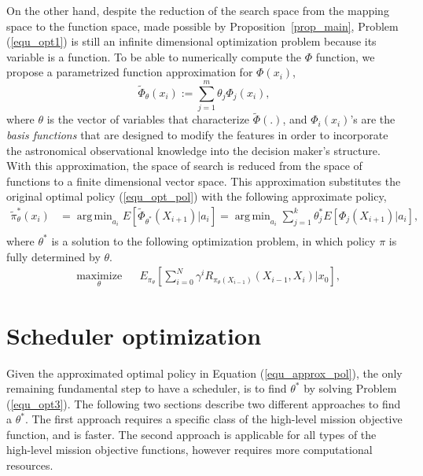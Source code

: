 \documentclass[12pt]{aastex62}
\theoremstyle{definition}
\DeclareMathOperator*{\argmin}{arg\,min}
\begin{document}
On the other hand, despite the reduction of the search space from the mapping space to the function space, made possible by Proposition~\ref{prop_main}, Problem (\ref{equ_opt1}) is still an infinite dimensional optimization problem because its variable is a function. To be able to numerically compute the $\Phi$ function, we propose a parametrized function approximation for $\Phi(x_{i})$,
\begin{equation*}
 \tilde{\Phi}_{\theta}({x}_{i}) := \sum_{j=1}^m \theta_j \Phi_j(x_{i}),
\end{equation*}
where $\theta$ is the vector of variables that characterize $\tilde{\Phi}(.)$, and $\Phi_i(x_i)$'s are the \textit{basis functions} that are designed to modify the features in order to incorporate the astronomical observational knowledge into the decision maker's structure. With this approximation, the space of search is reduced from the space of functions to a finite dimensional vector space. This approximation substitutes the original optimal policy (\ref{equ_opt_pol}) with the following approximate policy,
\begin{equation}\label{equ_approx_pol}
\begin{aligned}
\tilde{\pi}_{\theta}^*(x_{i})& = \argmin_{a_{i}} E[ \tilde{\Phi}_{\theta^*}(X_{i+1}) | a_{i}] =  \argmin_{a_{i}} \sum_{j=1}^k \theta^*_j E[\Phi_j(X_{i+1}) | a_{i}],\\
\end{aligned}
\end{equation}
where $\theta^*$ is a solution to the following optimization problem, in which policy $\pi$ is fully determined by $\theta$.
\begin{equation}\label{equ_opt3}
\begin{aligned}
& \underset{\theta}{\text{maximize}}
& & E_{\pi_{\theta}}[\sum_{i=0}^N \gamma^i R_{\pi_{\theta} (X_{i-1})}(X_{{i-1}}, X_{i}) | x_0],
\end{aligned}
\end{equation}

\section{Scheduler optimization}\label{sec_opt}
Given the approximated optimal policy in Equation (\ref{equ_approx_pol}), the only remaining fundamental step to have a scheduler, is to find $\theta^*$ by solving Problem (\ref{equ_opt3}). The following two sections describe two different approaches to find a $\theta^*$. The first approach requires a specific class of the high-level mission objective function, and is faster. The second approach is applicable for all types of the high-level mission objective functions, however requires more computational resources. 
\end{document}
